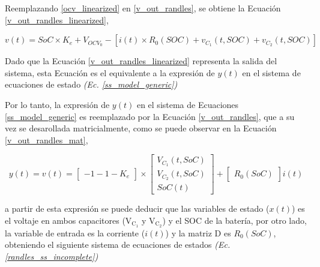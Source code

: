 \documentclass[10pt,a4paper]{article}
\begin{document}
Reemplazando \ref{ocv_linearized} en \ref{v_out_randles}, se obtiene la
Ecuaci\'on \ref{v_out_randles_linearized},

\begin{equation}
    v(t) = SoC \times K_e + V_{OCV_0} - \left[i(t) \times R_0\left(SOC\right) 
        + v_{C_1}\left(t, SOC\right) + v_{C_2}\left(t, SOC\right)\right] 
    \label{v_out_randles_linearized}
\end{equation}

Dado que la Ecuaci\'on \ref{v_out_randles_linearized} representa la salida del 
sistema, esta Ecuaci\'on es el equivalente a la expresi\'on de $y(t)$ en el 
sistema de ecuaciones de estado \emph{(Ec. \ref{ss_model_generic})}

Por lo tanto, la expresi\'on de $y(t)$ en el sistema de Ecuaciones
\ref{ss_model_generic} es reemplazado por la Ecuaci\'on \ref{v_out_randles}, que
a su vez se desarollada matricialmente, como se puede observar en la
Ecuaci\'on \ref{v_out_randles_mat},

\begin{equation}
    y(t) = v(t) = \begin{bmatrix} -1 -1 -K_e \end{bmatrix} \times 
    \begin{bmatrix} V_{C_1}(t, SoC) \\ V_{C_2}(t, SoC) \\ SoC(t) \end{bmatrix} +
    \begin{bmatrix} R_0(SoC) \end{bmatrix} i(t)\label{v_out_randles_mat}
\end{equation}

a partir de esta expresi\'on se puede deducir que las variables de estado 
($x(t)$) es el voltaje en ambos capacitores ($\mathrm{V_{C_1}}$ y 
$\mathrm{V_{C_2}}$) y el \acrshort{SOC} de la bater\'ia, por otro lado, la 
variable de entrada es la corriente ($i(t)$) y la matriz D es $R_0(SoC)$, 
obteniendo el siguiente sistema de ecuaciones de estados 
\emph{(Ec. \ref{randles_ss_incomplete})}
\end{document}

